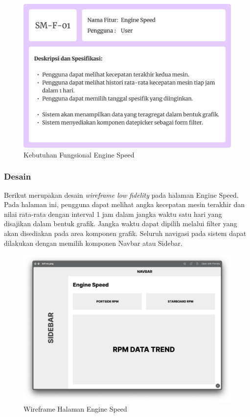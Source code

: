 \begin{figure}[!h]
    \includegraphics[width=.8\linewidth, center]{images/hasil/iterations/1/fr-es.png}
    \caption{Kebutuhan Fungsional Engine Speed}
    \label{fig:fr-es}
\end{figure}

\newpage

\subsubsection{Desain}
Berikut merupakan desain \textit{wireframe low fidelity} pada halaman Engine Speed. Pada halaman ini, pengguna dapat melihat angka kecepatan mesin terakhir dan nilai rata-rata dengan interval 1 jam dalam jangka waktu satu hari yang disajikan dalam bentuk grafik. Jangka waktu dapat dipilih melalui filter yang akan disediakan pada area komponen grafik. Seluruh navigasi pada sistem dapat dilakukan dengan memilih komponen Navbar atau Sidebar.

\begin{figure}[!h]
    \includegraphics[width=1.05\linewidth, center]{images/hasil/iterations/1/lofi-es.png}
    \caption{Wireframe Halaman Engine Speed}
    \label{fig:lofi-es}
\end{figure}


